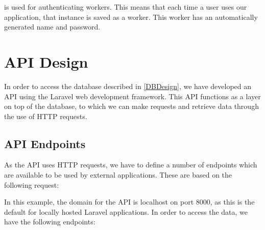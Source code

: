  is used for authenticating workers. This means that each time a
user uses our application, that instance is saved as a worker. This worker has
an automatically generated name and password.

\section{\ac{API} Design}
In order to access the database described in \autoref{DBDesign}, we have
developed an \ac{API} using the Laravel web development framework. This \ac{API} functions
as a layer on top of the database, to which we can make requests and retrieve
data through the use of \ac{HTTP} requests.

\subsection{\ac{API} Endpoints}
As the \ac{API} uses \ac{HTTP} requests, we have to define a number of
endpoints which are available to be used by external applications. These are based on the following
request:\nl

\nl

In this example, the domain for the \ac{API} is localhost on port 8000, as this is
the default for locally hosted Laravel applications. In order to access the
data, we have the following endpoints:

